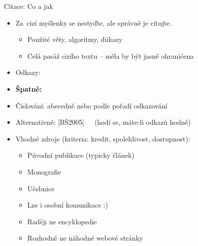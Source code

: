 \documentclass{beamer}
\begin{document}
\begin{frame}{Citace: Co a jak}

\begin{itemize}
\item Za~cizí myšlenky se nestyďte, ale správně je citujte.
   \begin{itemize}
   \item Použité věty, algoritmy, důkazy
   \item Celá pasáž cizího textu -- měla by být jasně ohraničena
   \end{itemize}
\item Odkazy: 
\item {\bf Špatně:} 
\item Číslování: abecedně nebo podle pořadí odkazování
\item Alternativně: [BŠ2005]~~~(hodí se, máte-li odkazů hodně)
\end{itemize}

\begin{itemize}
\item Vhodné zdroje (kriteria: kredit, spolehlivost, dostupnost):
   \begin{itemize}
   \item Původní publikace (typicky článek)
   \item Monografie
   \item Učebnice
   \item Lze i osobní komunikace :)
   \item Raději ne encyklopedie
   \item Rozhodně ne náhodné webové stránky
   \end{itemize}
\end{itemize}

\end{frame}
\end{document}
